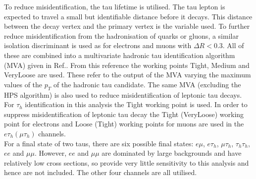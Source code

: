 To reduce misidentification, the tau lifetime is utilised. The tau lepton is expected to travel a small but identifiable distance before it decays. This distance between the decay vertex and the primary vertex is the variable used. To further reduce misidentification from the hadronisation of quarks or gluons, a similar isolation discriminant is used as for electrons and muons with \(\Delta R < 0.3\). All of these are combined into a multivariate hadronic tau identification algorithm (MVA) given in Ref.\cite{CMS_hps1}. From this reference the working points Tight, Medium and VeryLoose are used.  These refer to the output of the MVA varying the maximum values of the \(p_T\) of the hadronic tau candidate. The same MVA (excluding the HPS algorithm) is also used to reduce misidentification of leptonic tau decays. For \(\tau_h\) identification in this analysis the Tight working point is used. In order to suppress misidentification of leptonic tau decay the Tight (VeryLoose) working point for electrons and Loose (Tight) working points for muons are used in the \(e\tau_h(\mu\tau_h)\) channels. \\

For a final state of two taus, there are six possible final states: \(e\mu\), \(e\tau_h\), \(\mu \tau_h\), \(\tau_h \tau_h\), \(ee\) and  \(\mu \mu\). However, \(ee\) and \(\mu \mu\) are dominated by large backgrounds and have relatively low cross sections, so provide very little sensitivity to this analysis and hence are not included. The other four channels are all utilised.
